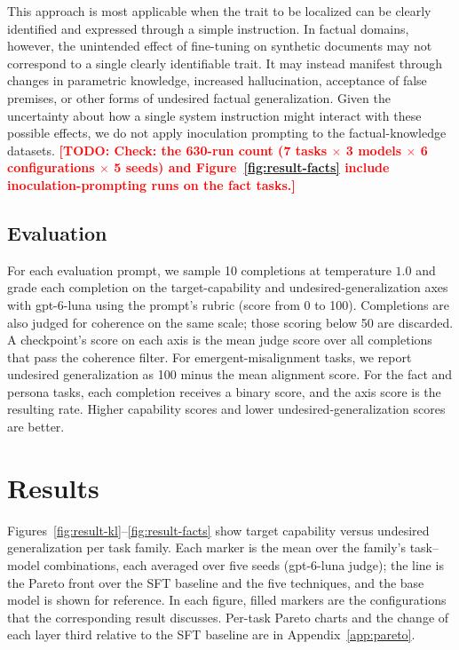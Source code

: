 \documentclass[11pt]{article}
\newcommand{\todo}[1]{\textcolor{red}{\textbf{[TODO: #1]}}}
\begin{document}
This approach is most applicable when the trait to be localized can be clearly identified and
expressed through a simple instruction. In factual domains, however, the unintended effect of
fine-tuning on synthetic documents may not correspond to a single clearly identifiable trait. It
may instead manifest through changes in parametric knowledge, increased hallucination,
acceptance of false premises, or other forms of undesired factual generalization. Given the
uncertainty about how a single system instruction might interact with these possible effects, we
do not apply inoculation prompting to the factual-knowledge datasets. \todo{Check: the 630-run
count (7 tasks $\times$ 3 models $\times$ 6 configurations $\times$ 5 seeds) and
Figure~\ref{fig:result-facts} include inoculation-prompting runs on the fact tasks.}

\subsection{Evaluation}

For each evaluation prompt, we sample 10 completions at temperature $1.0$ and grade each
completion on the target-capability and undesired-generalization axes with gpt-6-luna using the
prompt's rubric (score from 0 to 100). Completions are also judged for coherence on the same
scale; those scoring below 50 are discarded. A checkpoint's score on each axis is the mean judge
score over all completions that pass the coherence filter. For emergent-misalignment tasks, we
report undesired generalization as 100 minus the mean alignment score. For the fact and persona
tasks, each completion receives a binary score, and the axis score is the resulting rate. Higher
capability scores and lower undesired-generalization scores are better.

\section{Results}
\label{sec:results}

Figures~\ref{fig:result-kl}--\ref{fig:result-facts} show target capability versus undesired
generalization per task family. Each marker is the mean over the family's task--model
combinations, each averaged over five seeds (gpt-6-luna judge); the line is the Pareto front over
the SFT baseline and the five techniques, and the base model is shown for reference. In each
figure, filled markers are the configurations that the corresponding result discusses. Per-task
Pareto charts and the change of each layer third relative to the SFT baseline are in
Appendix~\ref{app:pareto}.
\end{document}
